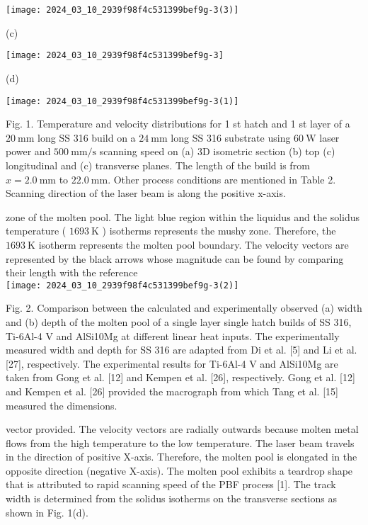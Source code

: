 \documentclass[10pt]{article}
\begin{document}
\begin{center}
\texttt{[image: 2024\_03\_10\_2939f98f4c531399bef9g-3(3)]}
\end{center}

(c)

\begin{center}
\texttt{[image: 2024\_03\_10\_2939f98f4c531399bef9g-3]}
\end{center}

(d)

\begin{center}
\texttt{[image: 2024\_03\_10\_2939f98f4c531399bef9g-3(1)]}
\end{center}

Fig. 1. Temperature and velocity distributions for 1 st hatch and 1 st layer of a $20 \mathrm{~mm}$ long SS 316 build on a $24 \mathrm{~mm}$ long SS 316 substrate using $60 \mathrm{~W}$ laser power and $500 \mathrm{~mm} / \mathrm{s}$ scanning speed on (a) 3D isometric section (b) top (c) longitudinal and (c) transverse planes. The length of the build is from $x=2.0 \mathrm{~mm}$ to $22.0 \mathrm{~mm}$. Other process conditions are mentioned in Table 2. Scanning direction of the laser beam is along the positive $\mathrm{x}$-axis.

zone of the molten pool. The light blue region within the liquidus and the solidus temperature ( $1693 \mathrm{~K}$ ) isotherms represents the mushy zone. Therefore, the $1693 \mathrm{~K}$ isotherm represents the molten pool boundary. The velocity vectors are represented by the black arrows whose magnitude can be found by comparing their length with the reference\\
\texttt{[image: 2024\_03\_10\_2939f98f4c531399bef9g-3(2)]}

Fig. 2. Comparison between the calculated and experimentally observed (a) width and (b) depth of the molten pool of a single layer single hatch builds of SS 316, Ti-6Al-4 V and AlSi10Mg at different linear heat inputs. The experimentally measured width and depth for SS 316 are adapted from Di et al. [5] and Li et al. [27], respectively. The experimental results for Ti-6Al-4 V and AlSi10Mg are taken from Gong et al. [12] and Kempen et al. [26], respectively. Gong et al. [12] and Kempen et al. [26] provided the macrograph from which Tang et al. [15] measured the dimensions.

vector provided. The velocity vectors are radially outwards because molten metal flows from the high temperature to the low temperature. The laser beam travels in the direction of positive X-axis. Therefore, the molten pool is elongated in the opposite direction (negative X-axis). The molten pool exhibits a teardrop shape that is attributed to rapid scanning speed of the PBF process [1]. The track width is determined from the solidus isotherms on the transverse sections as shown in Fig. 1(d).
\end{document}
